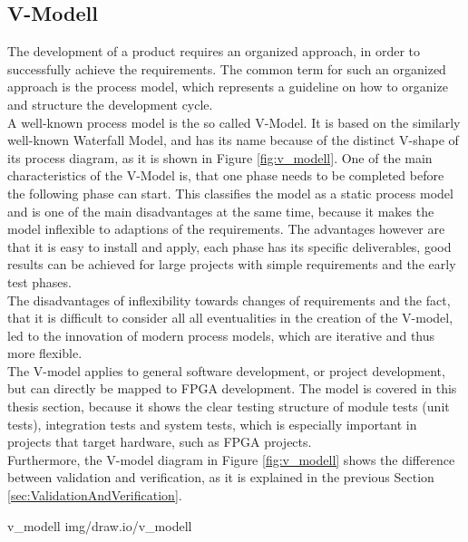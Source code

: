 \subsection{V-Modell}

The development of a product requires an organized approach, in order to successfully achieve the requirements.
The common term for such an organized approach is the process model, which represents a guideline on how to organize and structure the development cycle.\\

A well-known process model is the so called V-Model.
It is based on the similarly well-known Waterfall Model, and has its name because of the distinct V-shape of its process diagram, as it is shown in Figure \ref{fig:v_modell}.
One of the main characteristics of the V-Model is, that one phase needs to be completed before the following phase can start.
This classifies the model as a static process model and is one of the main disadvantages at the same time, because it makes the model inflexible to adaptions of the requirements.
The advantages however are that it is easy to install and apply, each phase has its specific deliverables, good results can be achieved for large projects with simple requirements and the early test phases.\\

The disadvantages of inflexibility towards changes of requirements and the fact, that it is difficult to consider all all eventualities in the creation of the V-model, led to the innovation of modern process models, which are iterative and thus more flexible.\\

The V-model applies to general software development, or project development, but can directly be mapped to FPGA development.
The model is covered in this thesis section, because it shows the clear testing structure of module tests (unit tests), integration tests and system tests, which is especially important in projects that target hardware, such as FPGA projects.\\

Furthermore, the V-model diagram in Figure \ref{fig:v_modell} shows the difference between validation and verification, as it is explained in the previous Section \ref{sec:ValidationAndVerification}.

 {v_modell} {img/draw.io/v_modell}

